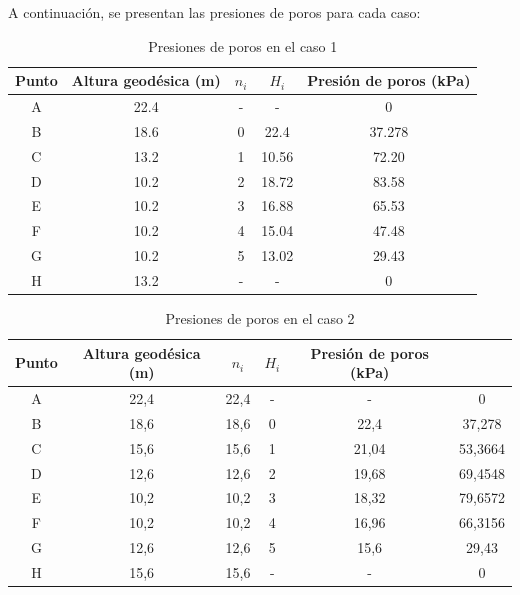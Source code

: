 \documentclass{article}
\begin{document}
\newpage

A continuación, se presentan las presiones de poros para cada caso:

\begin{table}[h!]
  \centering
  \begin{tabular}{ccccc}
    \hline
    \textbf{Punto} & \textbf{Altura geodésica (m)} & \textbf{$n_i$} & \textbf{$H_i$} & \textbf{Presión de poros (kPa)} \\
    \hline
    A & 22.4 & - & - &0 \\
    B & 18.6 &  0 & 22.4 &37.278 \\
    C & 13.2 & 1  & 10.56 &72.20 \\
    D & 10.2&  2 & 18.72 &83.58 \\
    E & 10.2 & 3  & 16.88 &65.53 \\
    F & 10.2 & 4  & 15.04 & 47.48\\
    G & 10.2 & 5  & 13.02 &29.43 \\
    H & 13.2 & - & - &0 \\
    \hline
  \end{tabular}
  \caption{Presiones de poros en el caso 1}
\end{table}


\begin{table}[h!]
  \centering
  \begin{tabular}{cccccc}
  \hline
  \textbf{Punto} & \textbf{Altura geodésica (m)} & \textbf{$n_i$} & \textbf{$H_i$} & \textbf{Presión de poros (kPa)} \\
  \hline
  A & 22,4 & 22,4 & - & - & 0  \\ 
  B & 18,6 & 18,6 & 0 & 22,4 & 37,278  \\ 
  C & 15,6 & 15,6 & 1 & 21,04 & 53,3664  \\ 
  D & 12,6 & 12,6 & 2 & 19,68 & 69,4548  \\ 
  E & 10,2 & 10,2 & 3 & 18,32 & 79,6572  \\ 
  F & 10,2 & 10,2 & 4 & 16,96 & 66,3156  \\ 
  G & 12,6 & 12,6 & 5 & 15,6 & 29,43  \\ 
  H & 15,6 & 15,6 & - & - & 0  \\ \hline
  \end{tabular}
  \caption{Presiones de poros en el caso 2}
  \end{table}
  
\end{document}
